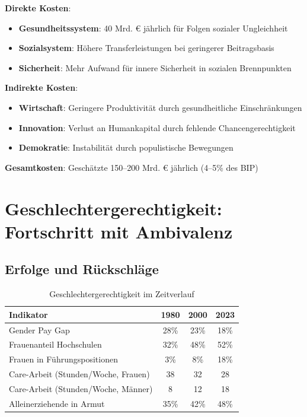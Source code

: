 \textbf{Direkte Kosten}:
\begin{itemize}
    \item \textbf{Gesundheitssystem}: 40 Mrd. € jährlich für Folgen sozialer Ungleichheit
    \item \textbf{Sozialsystem}: Höhere Transferleistungen bei geringerer Beitragsbasis
    \item \textbf{Sicherheit}: Mehr Aufwand für innere Sicherheit in sozialen Brennpunkten
\end{itemize}

\textbf{Indirekte Kosten}:
\begin{itemize}
    \item \textbf{Wirtschaft}: Geringere Produktivität durch gesundheitliche Einschränkungen
    \item \textbf{Innovation}: Verlust an Humankapital durch fehlende Chancengerechtigkeit
    \item \textbf{Demokratie}: Instabilität durch populistische Bewegungen
\end{itemize}

\textbf{Gesamtkosten}: Geschätzte 150–200 Mrd. € jährlich (4–5\% des BIP)

\section{Geschlechtergerechtigkeit: Fortschritt mit Ambivalenz}

\subsection{Erfolge und Rückschläge}

\begin{table}[ht]
    \centering
    \caption{Geschlechtergerechtigkeit im Zeitverlauf}
    \label{tab:geschlechtergerechtigkeit}
    \begin{tabular}{lccc}
        \toprule
        \textbf{Indikator} & \textbf{1980} & \textbf{2000} & \textbf{2023} \\
        \midrule
        Gender Pay Gap & 28\% & 23\% & 18\% \\
        Frauenanteil Hochschulen & 32\% & 48\% & 52\% \\
        Frauen in Führungspositionen & 3\% & 8\% & 18\% \\
        Care-Arbeit (Stunden/Woche, Frauen) & 38 & 32 & 28 \\
        Care-Arbeit (Stunden/Woche, Männer) & 8 & 12 & 18 \\
        Alleinerziehende in Armut & 35\% & 42\% & 48\% \\
        \bottomrule
    \end{tabular}
\end{table}

